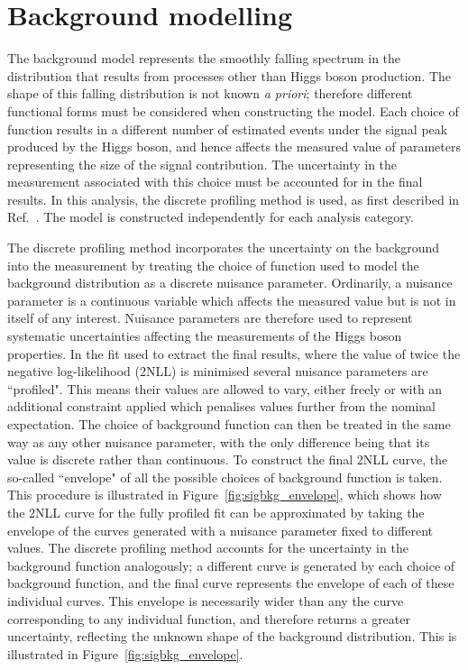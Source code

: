 
\section{Background modelling}

The background model represents the smoothly falling spectrum 
in the \mgg distribution that results from processes other than Higgs boson production.
The shape of this falling distribution is not known \textit{a priori};
therefore different functional forms must be considered when constructing the model.
Each choice of function results in a different number of estimated events 
under the signal peak produced by the Higgs boson, 
and hence affects the measured value of parameters representing the size of the signal contribution.
The uncertainty in the measurement associated with this choice must be accounted for 
in the final results.
In this analysis, the discrete profiling method is used, as first described in Ref.~\cite{Envelope}.
The model is constructed independently for each analysis category.

The discrete profiling method incorporates the uncertainty on the background 
into the measurement by treating the choice of function used to model the background distribution
as a discrete nuisance parameter.
Ordinarily, a nuisance parameter is a continuous variable which affects the measured value 
but is not in itself of any interest.
Nuisance parameters are therefore used to represent systematic uncertainties 
affecting the measurements of the Higgs boson properties.
In the fit used to extract the final results, 
where the value of twice the negative log-likelihood (2NLL) is minimised
several nuisance parameters are ``profiled".
This means their values are allowed to vary, 
either freely or with an additional constraint applied 
which penalises values further from the nominal expectation.
The choice of background function can then be treated in the same way as any other nuisance parameter, 
with the only difference being that its value is discrete rather than continuous.
To construct the final 2NLL curve, 
the so-called ``envelope" of all the possible choices of background function is taken.
This procedure is illustrated in Figure~\ref{fig:sigbkg_envelope}, 
which shows how the 2NLL curve for the fully profiled fit can be approximated 
by taking the envelope of the curves generated with a nuisance parameter fixed to different values.
The discrete profiling method accounts for the uncertainty in the background function analogously;
a different curve is generated by each choice of background function, 
and the final curve represents the envelope of each of these individual curves.
This envelope is necessarily wider than any the curve corresponding to any individual function, 
and therefore returns a greater uncertainty, 
reflecting the unknown shape of the background distribution.
This is illustrated in Figure~\ref{fig:sigbkg_envelope}.

